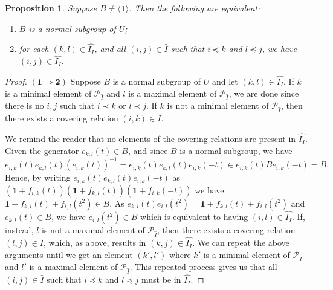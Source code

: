 \documentclass[11pt,letterpaper]{amsart}
\newtheorem{proposition}[theorem]{Proposition}
\newcommand{\PP}{\mathcal{P}}
\begin{document}
\begin{proposition}\label{prop:Pattern_BorelNormal}
    Suppose $B\neq \langle \mathbf{1}\rangle$. Then the following are equivalent:
    \begin{enumerate}
        \item $B$ is a normal subgroup of $U$;
        \item for each $(k,l)\in \widehat{I_I}$, and all $(i,j)\in \widehat{I}$ such that $i\preccurlyeq k$ and $l\preccurlyeq j$, we have $(i,j)\in \widehat{I_I}$.
    \end{enumerate}
\end{proposition}
\begin{proof}
$\mathbf{(1\Rightarrow 2)}$ Suppose $B$ is a normal subgroup of $U$ and let $(k,l)\in \widehat{I_I}$. If $k$ is a minimal element of $\PP_{\widehat{I}}$ and $l$ is a maximal element of $\PP_{\widehat{I}}$, we are done since there is no $i,j$ such that $i\prec k$ or $l \prec j$. If $k$ is not a minimal element of $\PP_{\widehat{I}}$, then there exists a covering relation $(i,k)\in I$.

We remind the reader that no elements of the covering relations are present in $\widehat{I_I}$.
Given the generator $e_{k,l}(t)\in B$, and since $B$ is a normal subgroup, we have  $$e_{i,k}(t)e_{k,l}(t)(e_{i,k}(t))^{-1} =e_{i,k}(t)e_{k,l}(t)e_{i,k}(-t) \in e_{i,k}(t)Be_{i,k}(-t) = B.$$ Hence, by writing $e_{i,k}(t)e_{k,l}(t)e_{i,k}(-t)$ as $(\mathbf{1} +f_{i,k}(t))(\mathbf{1} +f_{k,l}(t))( \mathbf{1}+f_{i,k}(-t))$ we have $\mathbf{1} + f_{k,l}(t) + f_{i,l}(t^2)\in B$. As $e_{k,l}(t)e_{i,l}(t^2) = \mathbf{1} + f_{k,l}(t) + f_{i,l}(t^2)$ and $e_{k,l}(t)\in B$, we have $e_{i,l}(t^2)\in B$ which is equivalent to having $(i,l)\in \widehat{I_I}$. If, instead, $l$ is not a maximal element of $\PP_{\widehat{I}}$, then there exists a covering relation $(l,j)\in I$, which, as above, results in $(k,j)\in \widehat{I_I}$.
We can repeat the above arguments until we get an element $(k',l')$ where $k'$ is a minimal element of $\PP_{\widehat{I}}$ and $l'$ is a maximal element of $\PP_{\widehat{I}}$. This repeated process gives us that all $(i,j) \in \widehat{I}$ such that $i\preccurlyeq k$ and $l\preccurlyeq j$ must be in $\widehat{I_I}$.


\end{proof}
\end{document}
